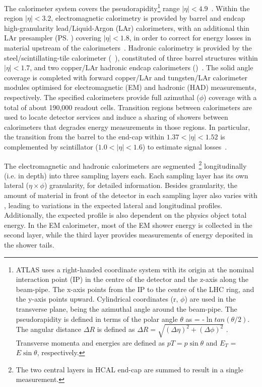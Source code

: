 The calorimeter system covers the pseudorapidity\footnote{ATLAS uses a right-handed coordinate system with its origin at the nominal interaction point (IP) in the centre of the detector and the z-axis along the beam-pipe. The x-axis points from the IP to the centre of the LHC ring, and the y-axis points upward. Cylindrical coordinates (r, $\phi$) are used in the transverse plane, \phi being the azimuthal angle around the beam-pipe. The pseudorapidity is defined in terms of the polar angle $\theta$ as \eta = -$\ln{tan(\theta/2)}$. The angular distance $\Delta R$ is defined as $\Delta R = \sqrt{(\Delta\eta)^{2} + (\Delta\phi)^{2}}$ . Transverse momenta and energies are defined as $pT = p\sin\theta$ and $E_{T}$ = $E\sin\theta$, respectively.} range \(|\eta| < 4.9\)~\cite{PERF-2007-01}. Within the region \(|\eta|< 3.2\),
electromagnetic calorimetry is provided by barrel and endcap high-granularity
lead/Liquid-Argon (LAr) calorimeters, with an additional thin LAr presampler
(\ps) covering \(|\eta| < 1.8\), in order to correct for energy losses in
material upstream of the calorimeters~\cite{LARG-2009-01,larg_tdr}. Hadronic
calorimetry is provided by the steel/scintillating-tile calorimeter
(\tilecal~\cite{TCAL-2017-01,tile_tdr}), constituted of three barrel structures
within \(|\eta| < 1.7\), and two copper/LAr hadronic endcap calorimeters
(\hec)~\cite{cal_tdr}.  The solid angle coverage is completed with forward
copper/LAr and tungsten/LAr calorimeter modules optimised for electromagnetic
(EM) and hadronic (HAD) measurements, respectively. The specified calorimeters
provide full azimuthal ($\phi$) coverage with a total of about 190,000 readout cells. Transition regions between calorimeters are used to locate detector services and induce a sharing of showers between calorimeters that degrades energy measurements in those regions. In particular, the transition from the barrel to the end-cap within
$1.37<|\eta|<1.52$ is complemented by scintillator ($1.0<|\eta|<1.6$) to
estimate signal losses~\cite{cal_tdr}.

The electromagnetic and hadronic calorimeters are segmented~\cite{PERF-2007-01}\footnote{The two
central layers in HCAL end-cap are summed to result in a single measurement.} longitudinally (i.e. in depth) into three sampling layers each. Each sampling layer has its own lateral ($\eta\times\phi$) granularity, for detailed information. Besides granularity, the amount of material in front of the detector in each sampling layer also varies with \abseta, leading to variations in the expected lateral and longitudinal profiles. Additionally, the expected
profile is also dependent on the physics object total energy. In the EM calorimeter, most of the EM shower energy is collected in the second layer, while the third layer provides measurements
of energy deposited in the shower tails. 

